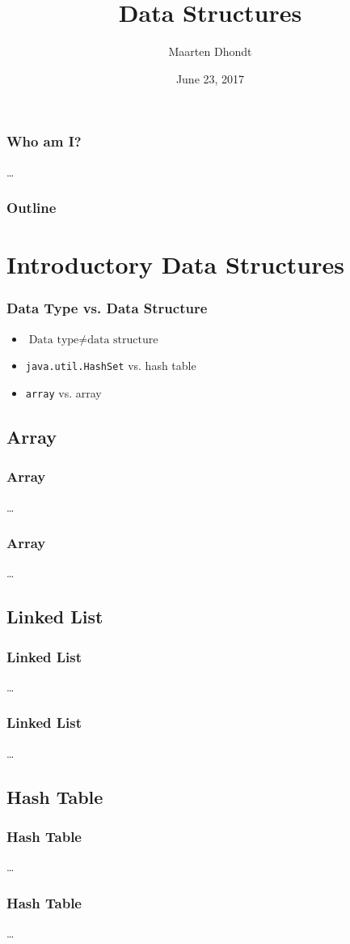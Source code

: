 \documentclass{beamer}
\title{Data Structures}
\author{Maarten Dhondt}
\institute{Realdolmen}
\date{June 23, 2017}
\begin{document}
\frame{\titlepage}

\begin{frame}
	\frametitle{Who am I?}
	\ldots
\end{frame}

\begin{frame}
  \frametitle{Outline}
  \tiny{\tableofcontents}
\end{frame}

\section{Introductory Data Structures}

\begin{frame}
	\frametitle{Data Type vs. Data Structure}
	\begin{itemize}
		\item<1-> $\text{Data type} \neq \text{data structure}$
		\item<2-> \texttt{java.util.HashSet} vs. hash table
		\item<2-> \texttt{array} vs. array
	\end{itemize}
\end{frame}

\subsection{Array}

\begin{frame}
	\frametitle{Array}
	\ldots
\end{frame}
\begin{frame}
	\frametitle{Array}
	\ldots
\end{frame}

\subsection{Linked List}

\begin{frame}
	\frametitle{Linked List}
	\ldots
\end{frame}
\begin{frame}
	\frametitle{Linked List}
	\ldots
\end{frame}

\subsection{Hash Table}

\begin{frame}
	\frametitle{Hash Table}
	\ldots
\end{frame}
\begin{frame}
	\frametitle{Hash Table}
	\ldots
\end{frame}
\end{document}
